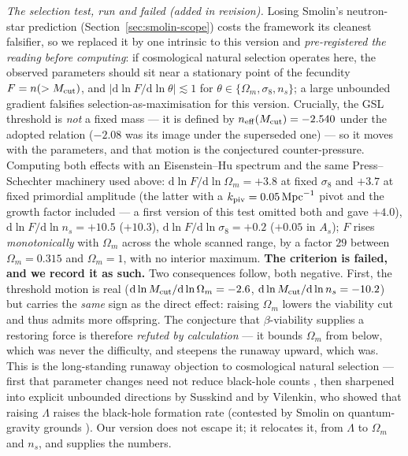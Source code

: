 \documentclass[11pt]{article}
\begin{document}
\emph{The selection test, run and failed (added in revision).} Losing Smolin's neutron-star
prediction (Section~\ref{sec:smolin-scope}) costs the framework its cleanest falsifier, so we
replaced it by one intrinsic to this version and \emph{pre-registered the reading before
computing}: if cosmological natural selection operates here, the observed parameters should sit
near a stationary point of the fecundity $F = n(>M_{\rm cut})$, and $|\mathrm{d}\ln F/\mathrm{d}\ln\theta| \lesssim 1$
for $\theta \in \{\Omega_m, \sigma_8, n_s\}$; a large unbounded gradient falsifies
selection-as-maximisation for this version. Crucially, the GSL threshold is \emph{not} a fixed
mass --- it is defined by $n_{\rm eff}(M_{\rm cut}) = -2.540$ under the adopted relation ($-2.08$ was its image under the superseded one) --- so it moves with the parameters,
and that motion is the conjectured counter-pressure. Computing both effects with an
Eisenstein--Hu spectrum and the same Press--Schechter machinery used above:
$\mathrm{d}\ln F/\mathrm{d}\ln\Omega_m = +3.8$ at fixed $\sigma_8$ and $+3.7$ at fixed primordial
amplitude (the latter with a $k_{\rm piv} = 0.05\,\mathrm{Mpc}^{-1}$ pivot and the growth factor
included --- a first version of this test omitted both and gave $+4.0$),
$\mathrm{d}\ln F/\mathrm{d}\ln n_s = +10.5$ ($+10.3$), $\mathrm{d}\ln F/\mathrm{d}\ln\sigma_8 = +0.2$
($+0.05$ in $A_s$);
$F$ rises \emph{monotonically} with $\Omega_m$ across the whole scanned range, by a factor $29$
between $\Omega_m = 0.315$ and $\Omega_m = 1$, with no interior maximum. \textbf{The criterion is
failed, and we record it as such.} Two consequences follow, both negative. First, the threshold
motion is real ($\mathrm{d}\ln M_{\rm cut}/\mathrm{d}\ln\Omega_m = -2.6$,
$\mathrm{d}\ln M_{\rm cut}/\mathrm{d}\ln n_s = -10.2$) but carries the \emph{same} sign as the
direct effect: raising $\Omega_m$ lowers the viability cut and thus admits more offspring. The
conjecture that $\beta$-viability supplies a restoring force is therefore \emph{refuted by
calculation} --- it bounds $\Omega_m$ from below, which was never the difficulty, and steepens
the runaway upward, which was. This is the long-standing runaway objection to cosmological natural selection --- first that parameter changes need not reduce black-hole counts \cite{RothmanEllis1993}, then sharpened into explicit unbounded directions by Susskind \cite{Susskind2004} and by Vilenkin, who showed that raising $\Lambda$ raises the black-hole formation rate \cite{Vilenkin2006} (contested by Smolin on quantum-gravity grounds \cite{Smolin2006}). Our version does not escape it; it relocates it, from $\Lambda$ to $\Omega_m$ and $n_s$, and supplies the numbers.
\end{document}
